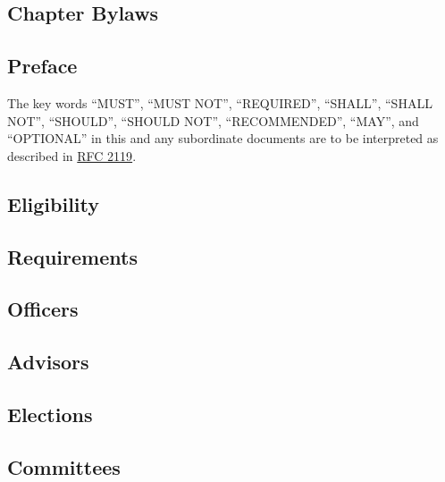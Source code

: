 \documentclass[bylaws,final,10pt,withoutoptional,withoutpreface]{../bylaws}
\begin{document}
\frontmatter
\maketitle
%

%
\tableofcontents\newpage
\mainmatter
\begin{optionalpart}
\part{Chapter Bylaws}
\end{optionalpart}

\chapter*{Preface}
The key words ``MUST'', ``MUST NOT'', ``REQUIRED'', ``SHALL'', ``SHALL NOT'', ``SHOULD'', ``SHOULD NOT'', ``RECOMMENDED'',  ``MAY'', and ``OPTIONAL'' in this and any subordinate documents are to be interpreted as described in \href{http://www.ietf.org/rfc/rfc2119.txt}{RFC 2119}.

\chapter{Eligibility}\label{sec:elegibility}


\chapter{Requirements}\label{sec:requirements}
 

\chapter{Officers}\label{sec:officers}


\chapter{Advisors}\label{sec:advisors}


\chapter{Elections}\label{sec:elections}



\chapter{Committees}\label{sec:committees}

\end{document}
